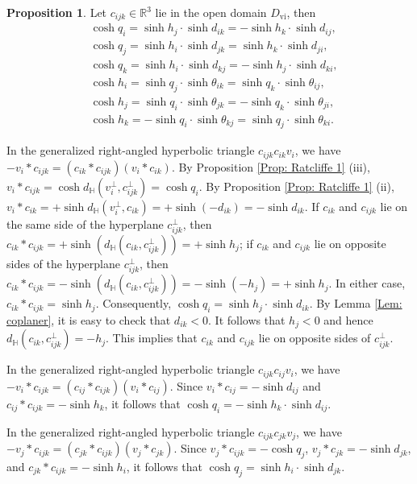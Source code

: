 \documentclass[12pt]{amsart}
\theoremstyle{definition}
\newtheorem{proposition}[theorem]{Proposition}
\begin{document}
\begin{proposition}
Let $c_{ijk}\in \mathbb{R}^3$ lie in the open domain $D_\mathrm{vi}$, then
\begin{equation*}
\begin{aligned}
&\cosh q_i=\sinh h_j\cdot\sinh d_{ik}
=-\sinh h_k\cdot\sinh d_{ij},\\
&\cosh q_j=\sinh h_i\cdot\sinh d_{jk}
=\sinh h_k\cdot\sinh d_{ji},\\
&\cosh q_k=\sinh h_i\cdot\sinh d_{kj}
=-\sinh h_j\cdot\sinh d_{ki},\\
&\cosh h_i=\sinh q_j\cdot\sinh \theta_{ik}
=\sinh q_k\cdot\sinh \theta_{ij},\\
&\cosh h_j=\sinh q_i\cdot\sinh \theta_{jk}
=-\sinh q_k\cdot\sinh \theta_{ji},\\
&\cosh h_k=-\sinh q_i\cdot\sinh \theta_{kj}
=\sinh q_j\cdot\sinh \theta_{ki}.
\end{aligned}
\end{equation*}
\end{proposition}
\proof
In the generalized right-angled hyperbolic triangle $c_{ijk}c_{ik}v_i$,
we have $-v_i\ast c_{ijk}=(c_{ik}\ast c_{ijk})(v_i\ast c_{ik})$.
By Proposition \ref{Prop: Ratcliffe 1} (iii),
$v_i\ast c_{ijk}=\cosh d_\mathbb{H}(v_i^\bot,c_{ijk}^\bot)=\cosh q_i$.
By Proposition \ref{Prop: Ratcliffe 1} (ii),
$v_i\ast c_{ik}=+\sinh d_\mathbb{H}(v_i^\bot,c_{ik})=+\sinh(-d_{ik})=-\sinh d_{ik}$.
If $c_{ik}$ and $c_{ijk}$ lie on the same side of the hyperplane $c_{ijk}^\bot$,
then $c_{ik}\ast c_{ijk}=+\sinh(d_\mathbb{H}(c_{ik},c_{ijk}^\bot))
=+\sinh h_j$;
if $c_{ik}$ and $c_{ijk}$ lie on opposite sides of the hyperplane $c_{ijk}^\bot$, then $c_{ik}\ast c_{ijk}=-\sinh(d_\mathbb{H}(c_{ik},c_{ijk}^\bot))
=-\sinh (-h_j)=+\sinh h_j$.
In either case, $c_{ik}\ast c_{ijk}=\sinh h_j$.
Consequently, $\cosh q_i=\sinh h_j\cdot\sinh d_{ik}$.
By Lemma \ref{Lem: coplaner}, it is easy to check that $d_{ik}<0$.
It follows that $h_j<0$ and hence
$d_\mathbb{H}(c_{ik},c_{ijk}^\bot)=-h_j$.
This implies that $c_{ik}$ and $c_{ijk}$ lie on opposite sides of $c_{ijk}^\bot$.

In the generalized right-angled hyperbolic triangle $c_{ijk}c_{ij}v_i$,
we have $-v_i\ast c_{ijk}=(c_{ij}\ast c_{ijk})(v_i\ast c_{ij})$.
Since $v_i\ast c_{ij}=-\sinh d_{ij}$ and
$c_{ij}\ast c_{ijk}=-\sinh h_k$,
it follows that $\cosh q_i=-\sinh h_k\cdot\sinh d_{ij}$.

In the generalized right-angled hyperbolic triangle $c_{ijk}c_{jk}v_j$,
we have $-v_j\ast c_{ijk}=(c_{jk}\ast c_{ijk})(v_j\ast c_{jk})$.
Since $v_j\ast c_{ijk}=-\cosh q_j$,
$v_j\ast c_{jk}=-\sinh d_{jk}$,
and $c_{jk}\ast c_{ijk}=-\sinh h_i$,
it follows that $\cosh q_j=\sinh h_i\cdot \sinh d_{jk}$.
\end{document}
